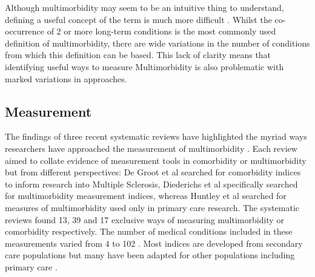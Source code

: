 \documentclass[12pt,]{report}
\begin{document}
\citep{RN226}

Although multimorbidity may seem to be an intuitive thing to understand,
defining a useful concept of the term is much more difficult
\citep{RN155}. Whilst the co-occurrence of 2 or more long-term
conditions is the most commonly used definition of multimorbidity, there
are wide variations in the number of conditions from which this
definition can be based. This lack of clarity means that identifying
useful ways to measure Multimorbidity is also problematic with marked
variations in approaches.

\subsection{Measurement}\label{subsec:mm-measures}

The findings of three recent systematic reviews have highlighted the
myriad ways researchers have approached the measurement of
multimorbidity \citep{RN16, RN34, RN29}. Each review aimed to collate
evidence of measurement tools in comorbidity or multimorbidity but from
different perspectives: De Groot et al \citeyearpar{RN16} searched for
comorbidity indices to inform research into Multiple Sclerosis,
Diederichs et al \citeyearpar{RN34} specifically searched for
multimorbidity measurement indices, whereas Huntley et al
\citeyearpar{RN29} searched for measures of multimorbidity used only in
primary care research. The systematic reviews found 13, 39 and 17
exclusive ways of measuring multimorbidity or comorbidity respectively.
The number of medical conditions included in these measurements varied
from 4 to 102 \citeyearpar{RN34}. Most indices are developed from
secondary care populations but many have been adapted for other
populations including primary care \citep{RN34, RN29}.
\end{document}
